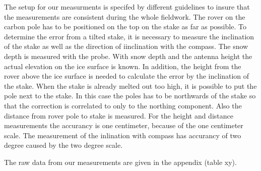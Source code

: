 The setup for our measurments is specifed by different guidelines to insure that the measurements are consistent during the whole fieldwork.
The rover on the carbon pole has to be positioned on the top on the stake as far as possible. 
To determine the error from a tilted stake, it is necessary to measure the inclination of the stake as well as the direction of iinclination with the compass.
The snow depth is measured with the probe.
With snow depth and the antenna height the actual elevation on the ice surface is known. 
In addition, the height from the rover above the ice surface is needed to calculate the error by the inclination of the stake.
When the stake is already melted out too high, it is possible to put the pole next to the stake. 
In this case the poles has to be northwards of the stake so that the correction is correlated to only to the northing component. 
Also the distance from rover pole to stake is measured.
For the height and distance measurements the accurancy is one centimeter, because of the one centimeter scale.
The measurement of the inlination with compass has accurancy of two degree caused by the two degree scale.


The raw data from our measurements are given in the appendix (table xy).